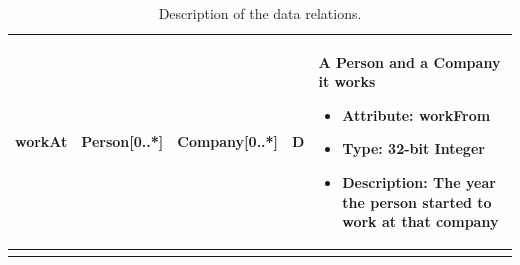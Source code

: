 \begin{longtable}{|p{2cm}|p{2.5cm}|p{2.5cm}|p{1cm}|p{7cm}|}
        \hline
        workAt & Person[0..*] & Company[0..*] & D & A Person and a Company it works
        \begin{itemize}
            \item \textbf{Attribute:} workFrom
            \item \textbf{Type:} 32-bit Integer
            \item \textbf{Description:} The year the person started to work at that company
        \end{itemize}
        \\
        \hline
        \caption{Description of the data relations.}
        \label{table:relations}
\end{longtable}

%
%
